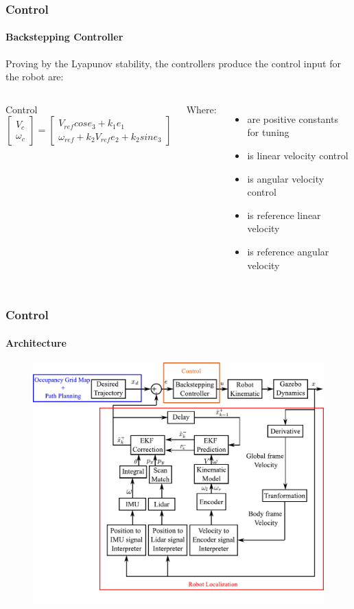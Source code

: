 \begin{frame}
	\frametitle{Control}
	\framesubtitle{Backstepping Controller}
	Proving by the Lyapunov stability\footnotemark, the controllers produce the control input for the robot are:
	\begin{columns}
		\begin{block}{Control}
			\begin{equation}
				\begin{bmatrix}
					V_c\\
					\omega_c
				\end{bmatrix} = 
				\begin{bmatrix}
					V_{ref} cos e_3 + k_1e_1\\
					\omega_{ref} + k_2 V_{ref} e_2 + k_2 sin e_3
				\end{bmatrix}
			\end{equation}
		\end{block}
		Where:
		\begin{itemize}
			\item { are positive constants for tuning}
			\item { is linear velocity control}
			\item { is angular velocity control}
			\item { is reference linear velocity}
			\item { is reference angular velocity}
		\end{itemize}
	\end{columns}
\end{frame}



\begin{frame}
	\frametitle{Control}
	\framesubtitle{Architecture}
	\begin{figure}
		\includegraphics[scale=0.45]{image/arch.pdf}
	\end{figure}
\end{frame}